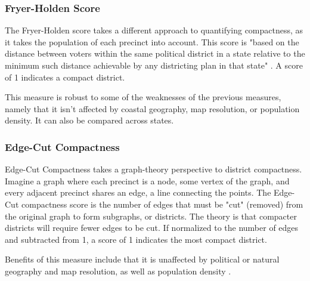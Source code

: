 \subsubsection{Fryer-Holden Score}

The Fryer-Holden score takes a different approach to quantifying compactness, as it takes the population of each precinct into account. This score is "based on the distance between voters within the same political district in a state relative to the minimum such distance achievable by any districting plan in that state" \parencite[2]{fryer2007}. A score of 1 indicates a compact district. 

This measure is robust to some of the weaknesses of the previous measures, namely that it isn't affected by coastal geography, map resolution, or population density. It can also be compared across states. \parencite{fryer2007}

\subsubsection{Edge-Cut Compactness}
\label{sec:edgecut}

Edge-Cut Compactness takes a graph-theory perspective to district compactness. Imagine a graph where each precinct is a node, some vertex of the graph, and every adjacent precinct shares an edge, a line connecting the points. The Edge-Cut compactness score is the number of edges that must be "cut" (removed) from the original graph to form subgraphs, or districts. The theory is that compacter districts will require fewer edges to be cut. \parencite{dube2016} If normalized to the number of edges and subtracted from 1, a score of 1 indicates the most compact district. 

Benefits of this measure include that it is unaffected by political or natural geography and map resolution, as well as population density \parencite[11]{mccartan2020}. 